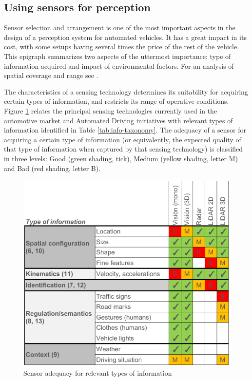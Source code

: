 \subsection{Using sensors for perception}
\label{sec:03-e-sensors-for-perception}

Sensor selection and arrangement is one of the most important aspects in the 
design of a perception system for automated vehicles. It has a great impact
in its cost, with some setups having several times the price of the rest of 
the vehicle. 
This epigraph summarizes two aspects of the uttermost importance: type of 
information acquired and impact of environmental factors. For an analysis of
spatial coverage and range see \cite{Schoettle2017}.

The characteristics of a sensing technology determines its 
suitability for acquiring certain types of information, and restricts its range 
of operative conditions.
Figure \ref{fig:information_vs_sensors} relates the principal sensing 
technologies currently used in the automotive market and Automated Driving
initiatives with relevant types of information identified in Table 
\ref{tab:info-taxonomy}. The adequacy of a sensor for acquiring a certain type
of information (or equivalently, the expected quality of that type of
information when captured by that sensing technology) is classified in three
levels: Good (green shading, tick), Medium (yellow shading, letter M) and Bad
(red shading, letter B).

\begin{figure}[h]
    \centering
    \includegraphics[width=0.95\linewidth]{"img/information_types_sensors"}
    \caption{Sensor adequacy for relevant types of information}
    \label{fig:information_vs_sensors}
\end{figure}

